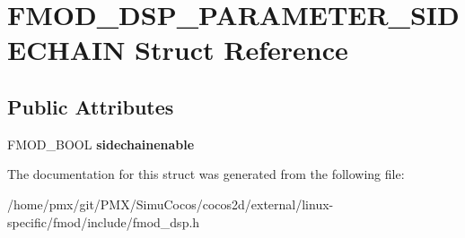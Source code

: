 \hypertarget{structFMOD__DSP__PARAMETER__SIDECHAIN}{}\section{F\+M\+O\+D\+\_\+\+D\+S\+P\+\_\+\+P\+A\+R\+A\+M\+E\+T\+E\+R\+\_\+\+S\+I\+D\+E\+C\+H\+A\+IN Struct Reference}
\label{structFMOD__DSP__PARAMETER__SIDECHAIN}
\subsection*{Public Attributes}
\begin{DoxyCompactItemize}
\item 
\mbox{\label{structFMOD__DSP__PARAMETER__SIDECHAIN_a1f89ce2f7a7d9b8a34c8d7844c1211aa}} 
F\+M\+O\+D\+\_\+\+B\+O\+OL {\bfseries sidechainenable}
\end{DoxyCompactItemize}


The documentation for this struct was generated from the following file\+:\begin{DoxyCompactItemize}
\item 
/home/pmx/git/\+P\+M\+X/\+Simu\+Cocos/cocos2d/external/linux-\/specific/fmod/include/fmod\+\_\+dsp.\+h\end{DoxyCompactItemize}
